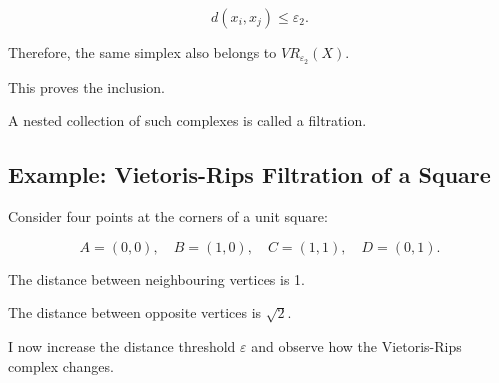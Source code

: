 \documentclass[oneside,english,11pt]{article}
\begin{document}
\begin{equation}
d(x_i,x_j)\leq\varepsilon_2.
\end{equation}

Therefore, the same simplex also belongs to
$VR_{\varepsilon_2}(X)$.

This proves the inclusion.

A nested collection of such complexes is called
a filtration.

\subsection{Example: Vietoris-Rips Filtration
of a Square}

Consider four points at the corners of a
unit square:

\begin{equation}
A=(0,0),\quad
B=(1,0),\quad
C=(1,1),\quad
D=(0,1).
\end{equation}

The distance between neighbouring vertices
is 1.

The distance between opposite vertices
is $\sqrt{2}$.

I now increase the distance threshold
$\varepsilon$ and observe how the
Vietoris-Rips complex changes.
\end{document}
